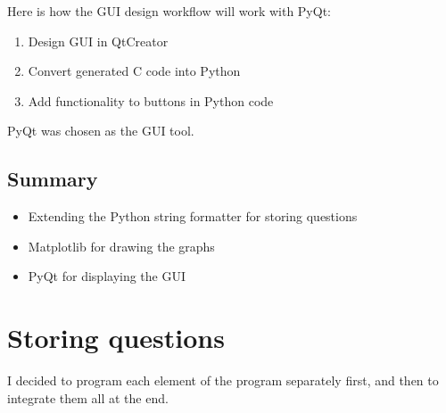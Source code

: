 Here is how the GUI design workflow will work with PyQt:
\begin{enumerate}
	\item Design GUI in QtCreator
	\item Convert generated C code into Python
	\item Add functionality to buttons in Python code
\end{enumerate}

PyQt was chosen as the GUI tool.

\subsection{Summary}
\begin{itemize}
	\item Extending the Python string formatter for storing questions
	\item Matplotlib for drawing the graphs
	\item PyQt for displaying the GUI
\end{itemize}
\section{Storing questions}
I decided to program each element of the program separately first, and then to integrate them all at the end.
